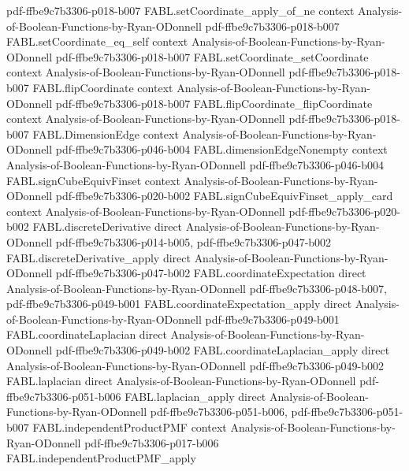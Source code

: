 \begin{theorem}
  {pdf-ffbe9c7b3306-p018-b007}
\proofstep
  {FABL.setCoordinate_apply_of_ne}
  {context}
  {Analysis-of-Boolean-Functions-by-Ryan-ODonnell}
  {pdf-ffbe9c7b3306-p018-b007}
\proofstep
  {FABL.setCoordinate_eq_self}
  {context}
  {Analysis-of-Boolean-Functions-by-Ryan-ODonnell}
  {pdf-ffbe9c7b3306-p018-b007}
\proofstep
  {FABL.setCoordinate_setCoordinate}
  {context}
  {Analysis-of-Boolean-Functions-by-Ryan-ODonnell}
  {pdf-ffbe9c7b3306-p018-b007}
\proofstep
  {FABL.flipCoordinate}
  {context}
  {Analysis-of-Boolean-Functions-by-Ryan-ODonnell}
  {pdf-ffbe9c7b3306-p018-b007}
\proofstep
  {FABL.flipCoordinate_flipCoordinate}
  {context}
  {Analysis-of-Boolean-Functions-by-Ryan-ODonnell}
  {pdf-ffbe9c7b3306-p018-b007}
\proofstep
  {FABL.DimensionEdge}
  {context}
  {Analysis-of-Boolean-Functions-by-Ryan-ODonnell}
  {pdf-ffbe9c7b3306-p046-b004}
\proofstep
  {FABL.dimensionEdgeNonempty}
  {context}
  {Analysis-of-Boolean-Functions-by-Ryan-ODonnell}
  {pdf-ffbe9c7b3306-p046-b004}
\proofstep
  {FABL.signCubeEquivFinset}
  {context}
  {Analysis-of-Boolean-Functions-by-Ryan-ODonnell}
  {pdf-ffbe9c7b3306-p020-b002}
\proofstep
  {FABL.signCubeEquivFinset_apply_card}
  {context}
  {Analysis-of-Boolean-Functions-by-Ryan-ODonnell}
  {pdf-ffbe9c7b3306-p020-b002}
\proofstep
  {FABL.discreteDerivative}
  {direct}
  {Analysis-of-Boolean-Functions-by-Ryan-ODonnell}
  {pdf-ffbe9c7b3306-p014-b005,
    pdf-ffbe9c7b3306-p047-b002}
\proofstep
  {FABL.discreteDerivative_apply}
  {direct}
  {Analysis-of-Boolean-Functions-by-Ryan-ODonnell}
  {pdf-ffbe9c7b3306-p047-b002}
\proofstep
  {FABL.coordinateExpectation}
  {direct}
  {Analysis-of-Boolean-Functions-by-Ryan-ODonnell}
  {pdf-ffbe9c7b3306-p048-b007,
    pdf-ffbe9c7b3306-p049-b001}
\proofstep
  {FABL.coordinateExpectation_apply}
  {direct}
  {Analysis-of-Boolean-Functions-by-Ryan-ODonnell}
  {pdf-ffbe9c7b3306-p049-b001}
\proofstep
  {FABL.coordinateLaplacian}
  {direct}
  {Analysis-of-Boolean-Functions-by-Ryan-ODonnell}
  {pdf-ffbe9c7b3306-p049-b002}
\proofstep
  {FABL.coordinateLaplacian_apply}
  {direct}
  {Analysis-of-Boolean-Functions-by-Ryan-ODonnell}
  {pdf-ffbe9c7b3306-p049-b002}
\proofstep
  {FABL.laplacian}
  {direct}
  {Analysis-of-Boolean-Functions-by-Ryan-ODonnell}
  {pdf-ffbe9c7b3306-p051-b006}
\proofstep
  {FABL.laplacian_apply}
  {direct}
  {Analysis-of-Boolean-Functions-by-Ryan-ODonnell}
  {pdf-ffbe9c7b3306-p051-b006,
    pdf-ffbe9c7b3306-p051-b007}
\proofstep
  {FABL.independentProductPMF}
  {context}
  {Analysis-of-Boolean-Functions-by-Ryan-ODonnell}
  {pdf-ffbe9c7b3306-p017-b006}
\proofstep
  {FABL.independentProductPMF_apply}

\end{theorem}
